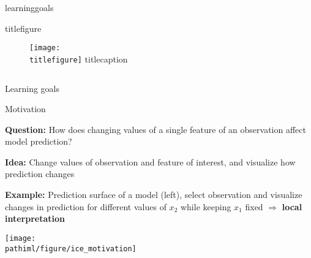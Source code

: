 \documentclass[11pt,compress,t,notes=noshow, aspectratio=169, xcolor=table]{beamer}
\makeatletter
\newcommand{\pathiml}{../../slides/03_feature-effects/}
\newcommand{\mysectionslide}{
\begin{frame}[plain]
    \vspace*{0.5 cm}
    \LARGE\bfseries\inserttitle
    \vspace*{0.5 cm}

    \ifx\lecturesection\@empty\relax\else%
    {\lecturesection}%
    \fi%

\ifcsname learninggoals\endcsname
  {\vspace*{0.5 cm}
  \begin{minipage}{0.4\textwidth}
  \ifcsname titlefigure\endcsname
    {\begin{center}
    \begin{figure}[!b]
    \texttt{[image: \\titlefigure]}
     \ifcsname titlecaption\endcsname
     \caption*{\titlecaption}
     \fi
    \end{figure}
    \end{center}}
  \else
    $\;$
  \fi
  \end{minipage}
  \begin{minipage}{0.55\textwidth}
  \normalsize
  Learning goals
   \normalfont
   \footnotesize
  \begin{itemize}
  \learninggoals
  \end{itemize}
  \end{minipage}}
\fi

  \end{frame}
}
\makeatother
\begin{document}

\mysectionslide

\begin{frame}{Motivation}

\textbf{Question:} How does changing values of a single feature of an observation affect model prediction?

\smallskip

\textbf{Idea:} Change values of observation and feature of interest, and visualize how prediction changes

\smallskip

\textbf{Example:} Prediction surface of a model (left), select observation and visualize changes in prediction for different values of $x_2$ while keeping $x_1$ fixed $\Rightarrow$ \textbf{local interpretation}

\centering
\texttt{[image: \\pathiml/figure/ice\_motivation]}

\end{frame}
\end{document}
